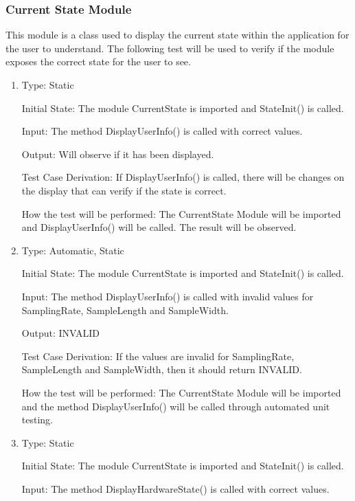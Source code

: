 \documentclass[12pt, titlepage]{article}
\begin{document}
\subsubsection{Current State Module}

This module is a class used to display the current state within the application for the user to understand.
The following test will be used to verify if the module exposes the correct state for the user to see.

\begin{enumerate}[{UT-CS}1.]

\item

Type: Static
          
Initial State: The module CurrentState is imported and StateInit() is called.
          
Input: The method DisplayUserInfo() is called with correct values.
          
Output: Will observe if it has been displayed.

Test Case Derivation: If DisplayUserInfo() is called, there will be changes on the display that can verify if the state is correct.


How the test will be performed: The CurrentState Module will be imported and DisplayUserInfo() will be called. The result will be observed.

\item

Type: Automatic, Static
					
Initial State: The module CurrentState is imported and StateInit() is called.
					
Input: The method DisplayUserInfo() is called with invalid values for SamplingRate, SampleLength and SampleWidth.
					
Output: INVALID

Test Case Derivation: If the values are invalid for SamplingRate, SampleLength and SampleWidth, then it should return INVALID.

How the test will be performed: The CurrentState Module will be imported and the method DisplayUserInfo() will be called through automated unit testing.

\item

Type: Static
          
Initial State: The module CurrentState is imported and StateInit() is called.
          
Input: The method DisplayHardwareState() is called with correct values.
          

\end{enumerate}
\end{document}
